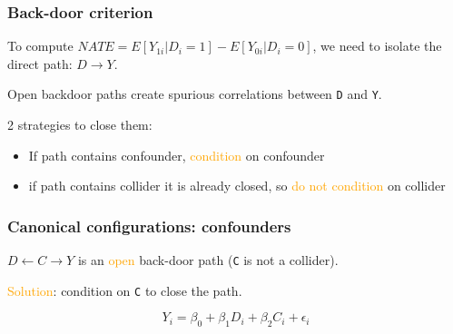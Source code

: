 \documentclass[12pt,english,dvipsnames,aspectratio=169,handout]{beamer}
\begin{document}
\begin{frame}
	\frametitle{Back-door criterion}
	To compute $NATE = E[Y_{1i} | D_i=1] - E[Y_{0i} | D_i=0]$, we need to isolate the direct path: $D \rightarrow Y$.\bigskip
	
	\pause
	
	Open backdoor paths create spurious correlations between \texttt{D} and \texttt{Y}.\bigskip
	
	\pause
	
	2 strategies to close them:
	
	\begin{itemize}
		\item If path contains confounder, \textcolor{orange}{condition} on confounder
		\item if path contains collider it is already closed, so \textcolor{orange}{do not condition} on collider
	\end{itemize}
	
\end{frame}


\begin{frame}
	\frametitle{Canonical configurations: confounders}
	\begin{figure}
		\centering
	\end{figure}
	
	$D \leftarrow C \rightarrow Y$ is an \textcolor{orange}{open} back-door path (\texttt{C} is not a collider).\bigskip
	
	\pause
	
	\textcolor{orange}{Solution}: condition on \texttt{C} to close the path.
	
	\begin{equation}
		Y_i = \beta_0 + \beta_1D_i + \beta_2C_i + \epsilon_i
	\end{equation}
	
\end{frame}
\end{document}
